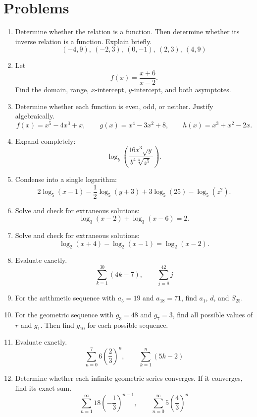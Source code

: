 \documentclass[12pt]{article}
\begin{document}
\section*{Problems}
\begin{enumerate}[leftmargin=*, itemsep=1.1em, topsep=0.8em]
  \item Determine whether the relation is a function. Then determine whether its inverse relation is a function. Explain briefly.
  \[
  (-4,9),\ (-2,3),\ (0,-1),\ (2,3),\ (4,9)
  \]

  \item Let
  \[
  f(x)=\frac{x+6}{x-2}.
  \]
  Find the domain, range, $x$-intercept, $y$-intercept, and both asymptotes.

  \item Determine whether each function is even, odd, or neither. Justify algebraically.
  \[
  f(x)=x^5-4x^3+x,\qquad
  g(x)=x^4-3x^2+8,\qquad
  h(x)=x^3+x^2-2x.
  \]

  \item Expand completely:
  \[
  \log_b\!\left(\frac{16x^3\sqrt{y}}{b^4\sqrt[3]{z^5}}\right).
  \]

  \item Condense into a single logarithm:
  \[
  2\log_5(x-1)-\frac12\log_5(y+3)+3\log_5(25)-\log_5(z^2).
  \]

  \item Solve and check for extraneous solutions:
  \[
  \log_3(x-2)+\log_3(x-6)=2.
  \]

  \item Solve and check for extraneous solutions:
  \[
  \log_2(x+4)-\log_2(x-1)=\log_2(x-2).
  \]

  \item Evaluate exactly.
  \[
  \sum_{k=1}^{30}(4k-7),\qquad
  \sum_{j=8}^{42}j
  \]

  \item For the arithmetic sequence with $a_5=19$ and $a_{18}=71$, find $a_1$, $d$, and $S_{25}$.

  \item For the geometric sequence with $g_3=48$ and $g_7=3$, find all possible values of $r$ and $g_1$. Then find $g_{10}$ for each possible sequence.

  \item Evaluate exactly.
  \[
  \sum_{n=0}^{7}6\left(\frac23\right)^n,\qquad
  \sum_{k=1}^{n}(5k-2)
  \]

  \item Determine whether each infinite geometric series converges. If it converges, find its exact sum.
  \[
  \sum_{n=1}^{\infty}18\left(-\frac13\right)^{n-1},\qquad
  \sum_{n=0}^{\infty}5\left(\frac43\right)^n
  \]
\end{enumerate}
\end{document}
